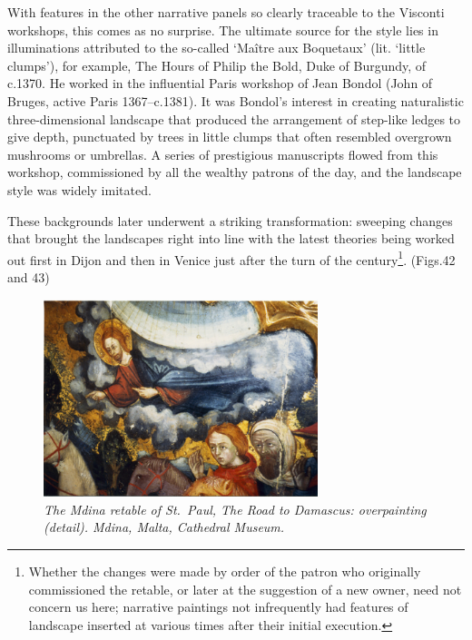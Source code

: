 \documentclass[a4paper,12pt]{article}
\begin{document}
With features in the other narrative panels so clearly traceable to
the Visconti workshops, this comes as no surprise. The ultimate source
for the style lies in illuminations attributed to the so-called
`Ma\^itre aux Boquetaux' (lit. `little clumps'), for example, The
Hours of Philip the Bold, Duke of Burgundy, of c.1370. He worked in
the influential Paris workshop of Jean Bondol (John of Bruges, active
Paris 1367--c.1381). It was Bondol's interest in creating
naturalistic three-dimensional landscape that produced the arrangement
of step-like ledges to give depth, punctuated by trees in little
clumps that often resembled overgrown mushrooms or umbrellas. A series
of prestigious manuscripts flowed from this workshop, commissioned by
all the wealthy patrons of the day, and the landscape style was widely
imitated.

These backgrounds later underwent a striking transformation: sweeping
changes that brought the landscapes right into line with the latest
theories being worked out first in Dijon and then in Venice just after
the turn of the century\footnote{Whether the changes were made by
order of the patron who originally commissioned the retable, or later
at the suggestion of a new owner, need not concern us here; narrative
paintings not infrequently had features of landscape inserted at
various times after their initial execution.}. (Figs.42 and 43) 
\begin{figure}[htbp]
\centering
\includegraphics[width=8cm]{pics/fig42.png}
\caption[The Mdina retable of St.~Paul, The Road to Damascus: overpainting
(detail)] 
{\it The Mdina retable of St.~Paul, The Road to Damascus: overpainting
(detail).  Mdina, Malta, Cathedral Museum.}
\end{figure}
\end{document}
